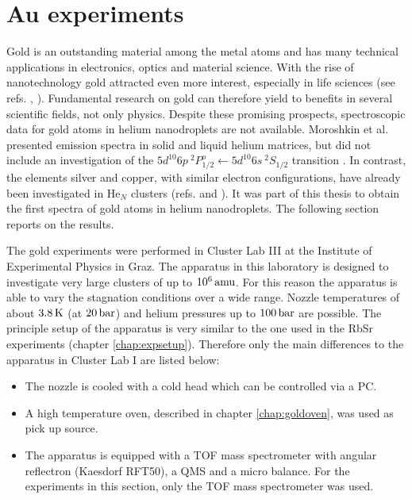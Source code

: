 \documentclass[parskip,12pt,headsepline,a4paper] {scrbook}
\begin{document}
\newpage

\section{Au experiments}
\vspace{-1\baselineskip}
\label{chap:auex}
Gold is an outstanding material among the metal atoms and has many technical applications in electronics, optics and material science. With the rise of nanotechnology gold attracted even more interest, especially in life sciences (see refs. \cite{biogold1}, \cite{biogold2}). Fundamental research on gold can therefore yield to benefits in several scientific fields, not only physics. Despite these promising prospects, spectroscopic data for gold atoms in helium nanodroplets are not available. Moroshkin et al. presented emission spectra in solid and liquid helium matrices, but did not include an investigation of the $5d^{10} 6p \ ^2P^o_{1/2} \leftarrow 5d^{10} 6s \ ^2S_{1/2}$ transition \cite{moroshkin}. In contrast, the elements silver and copper, with similar electron configurations, have already been investigated in He$_N$ clusters (refs. \cite{loginov2007excited} and \cite{cufritz}).
It was part of this thesis to obtain the first spectra of gold atoms in helium nanodroplets. The following section reports on the results.

The gold experiments were performed in Cluster Lab III at the Institute of Experimental Physics in Graz. The apparatus in this laboratory is designed to investigate very large clusters of up to $\unit[10^6]{amu}$. For this reason the apparatus is able to vary the stagnation conditions over a wide range. Nozzle temperatures of about $\unit[3.8]{K}$ (at $\unit[20]{bar}$) and helium pressures up to $\unit[100]{bar}$ are possible. The principle setup of the apparatus is very similar to the one used in the RbSr experiments (chapter \ref{chap:expsetup}). Therefore only the main differences to the apparatus in Cluster Lab I are listed below:

\begin{itemize}
\item The nozzle is cooled with a cold head which can be controlled via a PC.
\item A high temperature oven, described in chapter \ref{chap:goldoven}, was used as pick up source.
\item The apparatus is equipped with a TOF mass spectrometer with angular reflectron (Kaesdorf RFT50), a QMS and a micro balance. For the experiments in this section, only the TOF mass spectrometer was used.
\end{itemize}
\end{document}
